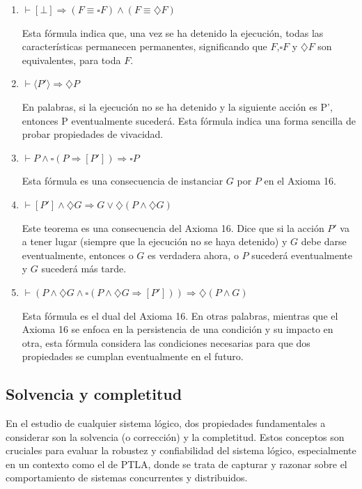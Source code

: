 \begin{enumerate}
    \item $\vdash [\bot] \Rightarrow (F \equiv \square F) \land (F \equiv \diamondsuit F)$

    Esta fórmula indica que, una vez se ha detenido la ejecución, todas las características permanecen permanentes, significando que $F$,$\square F$ y $\diamondsuit F$ son equivalentes, para toda $F$.
    
    \item $\vdash \langle P' \rangle \Rightarrow \diamondsuit P$

    En palabras, si la ejecución no se ha detenido y la siguiente acción es P', entonces P eventualmente sucederá. Esta fórmula indica una forma sencilla de probar propiedades de vivacidad.

    
    \item $\vdash P \land \square(P \Rightarrow [P']) \Rightarrow \square P$

    Esta fórmula es una consecuencia de instanciar $G$ por $P$ en el Axioma 16.
    
    \item $\vdash [P'] \land \diamondsuit G \Rightarrow G \lor \diamondsuit (P \land \diamondsuit G)$

    Este teorema es una consecuencia del Axioma 16. Dice que si la acción $P'$ va a tener lugar (siempre que la ejecución no se haya detenido) y $G$ debe darse eventualmente, entonces o $G$ es verdadera ahora, o $P$ sucederá eventualmente y $G$ sucederá más tarde.
    
    \item $\vdash (P \land \diamondsuit G \land \square (P \land \diamondsuit G \Rightarrow [P'])) \Rightarrow \diamondsuit (P \land G)$

    Esta fórmula es el dual del Axioma 16. En otras palabras, mientras que el Axioma 16 se enfoca en la persistencia de una condición y su impacto en otra, esta fórmula considera las condiciones necesarias para que dos propiedades se cumplan eventualmente en el futuro.
\end{enumerate}

\subsection{Solvencia y completitud}\label{subsection:TLAcompleteness}
En el estudio de cualquier sistema lógico, dos propiedades fundamentales a considerar son la solvencia (o corrección) y la completitud. Estos conceptos son cruciales para evaluar la robustez y confiabilidad del sistema lógico, especialmente en un contexto como el de PTLA, donde se trata de capturar y razonar sobre el comportamiento de sistemas concurrentes y distribuidos.

